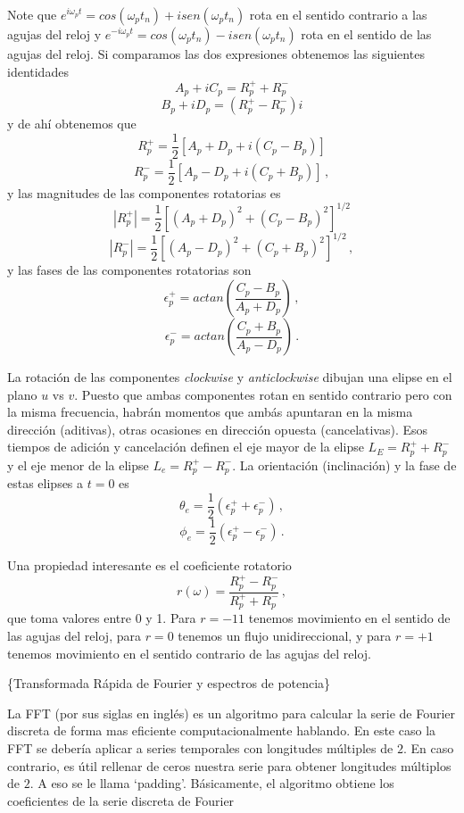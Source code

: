 \documentclass[
]{agujournal2019}
\begin{document}
Note que
\(e^{i\omega_p t}=cos\left(\omega_p t_n\right) + i sen\left(\omega_p t_n\right)\)
rota en el sentido contrario a las agujas del reloj y
\(e^{-i\omega_p t}=cos\left(\omega_p t_n\right) - i sen\left(\omega_p t_n\right)\)
rota en el sentido de las agujas del reloj. Si comparamos las dos
expresiones obtenemos las siguientes identidades
\[A_{p} + i C_{p}=R_p^+ + R_p^{-}\]
\[B_{p} + i D_{p}=(R_p^+ - R_p^{-})i\] y de ahí obtenemos que
\[R_p^+=\frac{1}{2}\left[ A_{p} + D_{p} +i(C_{p}-B_{p})\right]\]
\[R_p^-=\frac{1}{2}\left[ A_{p} - D_{p} +i(C_{p}+B_{p})\right]\,,\] y
las magnitudes de las componentes rotatorias es
\[|R_p^+|=\frac{1}{2}\left[ (A_{p} + D_{p})^2 +(C_{p}-B_{p})^2\right]^{1/2}\]
\[|R_p^-|=\frac{1}{2}\left[ (A_{p} - D_{p})^2 +(C_{p}+B_{p})^2\right]^{1/2}\,,\]
y las fases de las componentes rotatorias son
\[\epsilon_p^+=actan\left(\frac{C_{p}-B_{p}}{A_{p} + D_{p}}\right)\,,\]
\[\epsilon_p^-=actan\left(\frac{C_{p}+B_{p}}{A_{p} - D_{p}}\right)\,.\]

La rotación de las componentes \emph{clockwise} y \emph{anticlockwise}
dibujan una elipse en el plano \(u\) vs \(v\). Puesto que ambas
componentes rotan en sentido contrario pero con la misma frecuencia,
habrán momentos que ambás apuntaran en la misma dirección (aditivas),
otras ocasiones en dirección opuesta (cancelativas). Esos tiempos de
adición y cancelación definen el eje mayor de la elipse
\(L_E=R_p^+ + R_p^-\) y el eje menor de la elipse \(L_e=R_p^+ - R_p^-\).
La orientación (inclinación) y la fase de estas elipses a \(t=0\) es
\[\theta_e=\frac{1}{2}(\epsilon_p^+ + \epsilon_p^-)\,,\]
\[\phi_e=\frac{1}{2}(\epsilon_p^+ - \epsilon_p^-)\,.\]

Una propiedad interesante es el coeficiente rotatorio
\[r(\omega)=\frac{R^+_p - R^-_p}{R^+_p + R^-_p}\,,\] que toma valores
entre 0 y 1. Para \(r=-11\) tenemos movimiento en el sentido de las
agujas del reloj, para \(r=0\) tenemos un flujo unidireccional, y para
\(r=+1\) tenemos movimiento en el sentido contrario de las agujas del
reloj.

\vspace{0.5cm}

\{\textbf \large Transformada Rápida de Fourier y espectros de
potencia\}

La FFT (por sus siglas en inglés) es un algoritmo para calcular la serie
de Fourier discreta de forma mas eficiente computacionalmente hablando.
En este caso la FFT se debería aplicar a series temporales con
longitudes múltiples de \(2\). En caso contrario, es útil rellenar de
ceros nuestra serie para obtener longitudes múltiplos de \(2\). A eso se
le llama `padding'. Básicamente, el algoritmo obtiene los coeficientes
de la serie discreta de Fourier
\end{document}

